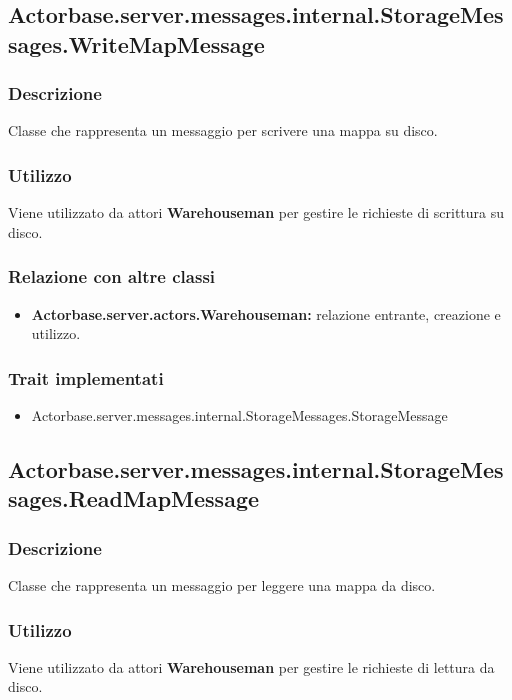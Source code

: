 \documentclass[a4paper]{article}
\begin{document}
\subsection{Actorbase.server.messages.internal.StorageMessages.WriteMapMessage}
			\subsubsection{Descrizione}
				Classe che rappresenta un messaggio per scrivere una mappa su disco.
				
			\subsubsection{Utilizzo}
				Viene utilizzato da attori \textbf{Warehouseman} per gestire le richieste di scrittura su disco.
				
			\subsubsection{Relazione con altre classi}
				\begin{itemize}
					\item \textbf{Actorbase.server.actors.Warehouseman:} relazione entrante, creazione e utilizzo.
				\end{itemize}
				
			\subsubsection{Trait implementati}
				\begin{itemize}
					\item Actorbase.server.messages.internal.StorageMessages.StorageMessage
				\end{itemize}				
				
				

\subsection{Actorbase.server.messages.internal.StorageMessages.ReadMapMessage}
			\subsubsection{Descrizione}
				Classe che rappresenta un messaggio per leggere una mappa da disco.
				
			\subsubsection{Utilizzo}
				Viene utilizzato da attori \textbf{Warehouseman} per gestire le richieste di lettura da disco.
				
\end{document}
